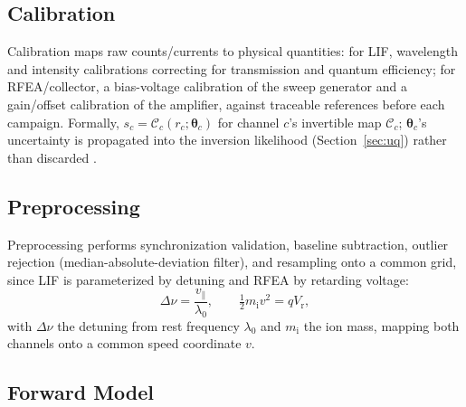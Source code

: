 \subsection{Calibration}
\label{sec:calibration}

Calibration maps raw counts/currents to physical quantities: for LIF, wavelength and intensity calibrations correcting for transmission and quantum efficiency; for RFEA/collector, a bias-voltage calibration of the sweep generator and a gain/offset calibration of the amplifier, against traceable references before each campaign. Formally, $s_c = \mathcal{C}_c(r_c; \boldsymbol{\theta}_c)$ for channel $c$'s invertible map $\mathcal{C}_c$; $\boldsymbol{\theta}_c$'s uncertainty is propagated into the inversion likelihood (Section~\ref{sec:uq}) rather than discarded \cite{ref0709}.

\subsection{Preprocessing}
\label{sec:preprocessing}

Preprocessing performs synchronization validation, baseline subtraction, outlier rejection (median-absolute-deviation filter), and resampling onto a common grid, since LIF is parameterized by detuning and RFEA by retarding voltage:
\begin{equation}
\Delta\nu = \frac{v_{\parallel}}{\lambda_0}, \qquad
\tfrac{1}{2} m_{\mathrm{i}} v^2 = q V_{\mathrm{r}},
\label{eq:param-map}
\end{equation}
with $\Delta\nu$ the detuning from rest frequency $\lambda_0$ and $m_{\mathrm{i}}$ the ion mass, mapping both channels onto a common speed coordinate $v$.

\subsection{Forward Model}
\label{sec:forward-model}

